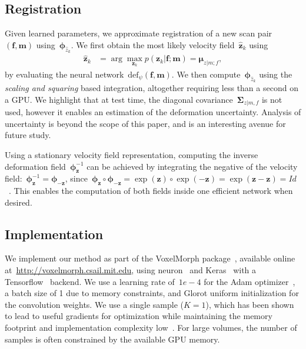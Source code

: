 \documentclass{article}
\newcommand{\bmu}{\boldsymbol{\mu}}
\newcommand{\bphi}{\boldsymbol{\phi}}
\newcommand{\bSigma}{\boldsymbol{\Sigma}}
\newcommand{\bz}{\boldsymbol{z}}
\newcommand{\bmoving}{\boldsymbol{m}}
\newcommand{\bfixed}{\boldsymbol{f}}
\newcommand{\moving}{m}
\newcommand{\fixed}{f}
\newcommand{\citep}{\cite}
\begin{document}
\subsection{Registration}


Given learned parameters, we approximate registration of a new scan pair~$(\bfixed, \bmoving)$ using~$\bphi_{\hat{z}_k}$. 
We first obtain the most likely velocity field~$\hat{\bz}_k$ using
\begin{align}
\hat{\bz}_k &= \arg \max_{\bz_k} p(\bz_k | \bfixed; \bmoving) = \bmu_{z|\moving;\fixed},
\label{eq:MAP1}
\end{align}
by evaluating the neural network~$\text{def}_\psi(\bfixed, \bmoving)$. We then compute~$\bphi_{\hat{z}_k}$ using the \textit{scaling and squaring} based integration, altogether requiring less than a second on a GPU. We highlight that at test time, the diagonal covariance~$\bSigma_{z | \moving, \fixed}$ is not used, however it enables an estimation of the deformation uncertainty. Analysis of uncertainty is beyond the scope of this paper, and is an interesting avenue for future study.

Using a stationary velocity field representation, computing the inverse deformation field~$\bphi^{-1}_{\bz}$ can be achieved by integrating the negative of the velocity field:~$\bphi^{-1}_{\bz} = \bphi_{-\bz}$, since~$\bphi_{\bz} \circ \bphi_{-\bz} = \exp(\bz)\circ\exp(-\bz) = \exp(\bz-\bz) = Id$~\citep{ashburner2007,modat2014}. This enables the computation of both fields inside one efficient network when desired.

{\color{blue}
\subsection{Implementation}

We implement our method as part of the VoxelMorph package~\citep{balakrishnan2018a}, available online at~\mbox{\url{http://voxelmorph.csail.mit.edu}}, using neuron~\citep{dalca2018priors} and Keras~\citep{chollet2015} with a Tensorflow~\citep{abadi2016} backend. We use a learning rate of~$1e-4$ for the Adam optimizer~\cite{kingma2014}, a batch size of 1 due to memory constraints, and Glorot uniform initialization for the convolution weights. We use a single sample ($K=1$), which has been shown to lead to useful gradients for optimization while maintaining the memory footprint and implementation complexity low~\citep{kingma2013}. For large volumes, the number of samples is often constrained by the available GPU memory. }
\end{document}
